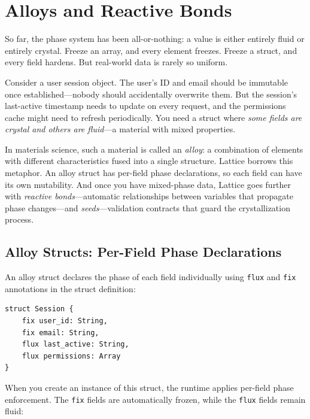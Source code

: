 \chapter{Alloys and Reactive Bonds}\label{ch:alloys-bonds}


So far, the phase system has been all-or-nothing: a value is either entirely fluid or entirely crystal.
Freeze an array, and every element freezes.
Freeze a struct, and every field hardens.
But real-world data is rarely so uniform.

Consider a user session object.
The user's ID and email should be immutable once established---nobody should accidentally overwrite them.
But the session's last-active timestamp needs to update on every request, and the permissions cache might need to refresh periodically.
You need a struct where \emph{some fields are crystal and others are fluid}---a material with mixed properties.

In materials science, such a material is called an \emph{alloy}: a combination of elements with different characteristics fused into a single structure.
Lattice borrows this metaphor.
An alloy struct has per-field phase declarations, so each field can have its own mutability.
And once you have mixed-phase data, Lattice goes further with \emph{reactive bonds}---automatic relationships between variables that propagate phase changes---and \emph{seeds}---validation contracts that guard the crystallization process.

\section{Alloy Structs: Per-Field Phase Declarations}\label{sec:alloy-structs}


An alloy struct declares the phase of each field individually using \lstinline|flux| and \lstinline|fix| annotations in the struct definition:

\begin{lstlisting}[language=Lattice, caption={Defining an alloy struct}]
struct Session {
    fix user_id: String,
    fix email: String,
    flux last_active: String,
    flux permissions: Array
}
\end{lstlisting}

When you create an instance of this struct, the runtime applies per-field phase enforcement.
The \lstinline|fix| fields are automatically frozen, while the \lstinline|flux| fields remain fluid:

